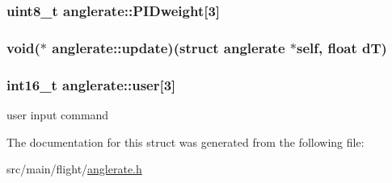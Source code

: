 \hypertarget{structanglerate_af067ec7680ad2ae0127d7f904abdcb0e}{
\subsubsection[{P\+I\+Dweight}]{\setlength{\rightskip}{0pt plus 5cm}uint8\+\_\+t anglerate\+::\+P\+I\+Dweight\mbox{[}3\mbox{]}}}\label{structanglerate_af067ec7680ad2ae0127d7f904abdcb0e}
\hypertarget{structanglerate_a451594ac6c3fc331c36e1dc8ed3d928d}{
\subsubsection[{update}]{\setlength{\rightskip}{0pt plus 5cm}void($\ast$ anglerate\+::update)(struct {\bf anglerate} $\ast$self, float d\+T)}}\label{structanglerate_a451594ac6c3fc331c36e1dc8ed3d928d}
\hypertarget{structanglerate_ad75fb5013c76c41ae7ddd01658469b99}{
\subsubsection[{user}]{\setlength{\rightskip}{0pt plus 5cm}int16\+\_\+t anglerate\+::user\mbox{[}3\mbox{]}}}\label{structanglerate_ad75fb5013c76c41ae7ddd01658469b99}


user input command 



The documentation for this struct was generated from the following file\+:\begin{DoxyCompactItemize}
\item 
src/main/flight/\hyperlink{flight_2anglerate_8h}{anglerate.\+h}\end{DoxyCompactItemize}
